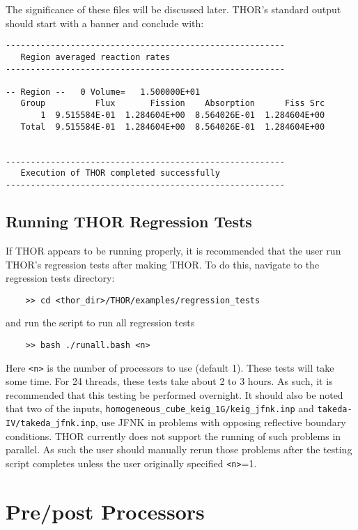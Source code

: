 The significance of these files will be discussed later.
\ac{THOR}'s standard output should start with a banner and conclude with:
\begin{verbatim}
--------------------------------------------------------
   Region averaged reaction rates
--------------------------------------------------------

-- Region --   0 Volume=   1.500000E+01
   Group          Flux       Fission    Absorption      Fiss Src
       1  9.515584E-01  1.284604E+00  8.564026E-01  1.284604E+00
   Total  9.515584E-01  1.284604E+00  8.564026E-01  1.284604E+00


--------------------------------------------------------
   Execution of THOR completed successfully
--------------------------------------------------------
\end{verbatim}

\subsection{Running THOR Regression Tests}

If \ac{THOR} appears to be running properly, it is recommended that the user run \ac{THOR}'s regression tests after making \ac{THOR}.
To do this, navigate to the regression tests directory:
\begin{verbatim}
    >> cd <thor_dir>/THOR/examples/regression_tests
\end{verbatim}
and run the script to run all regression tests
\begin{verbatim}
    >> bash ./runall.bash <n>
\end{verbatim}
Here \verb"<n>" is the number of processors to use (default 1).
These tests will take some time.
For 24 threads, these tests take about 2 to 3 hours.
As such, it is recommended that this testing be performed overnight.
It should also be noted that two of the inputs, \verb"homogeneous_cube_keig_1G/keig_jfnk.inp" and \verb"takeda-IV/takeda_jfnk.inp", use JFNK in problems with opposing reflective boundary conditions.
\ac{THOR} currently does not support the running of such problems in parallel.
As such the user should manually rerun those problems after the testing script completes unless the user originally specified \verb"<n>"=1.

\section{Pre/post Processors}

